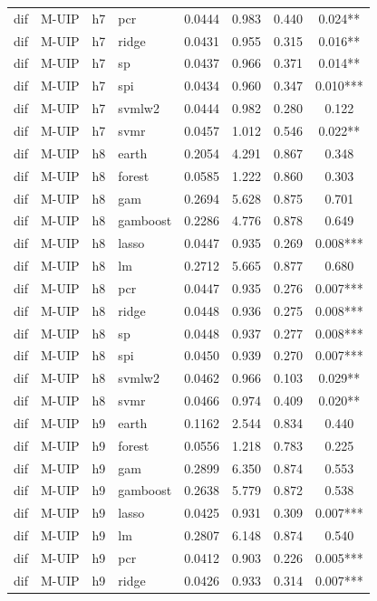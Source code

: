 \begin{ThreePartTable}
\begin{longtable}[t]{llclcccc}
dif & M-UIP & h7 & pcr & 0.0444 & 0.983 & 0.440 & 0.024**\\
dif & M-UIP & h7 & ridge & 0.0431 & 0.955 & 0.315 & 0.016**\\
dif & M-UIP & h7 & sp & 0.0437 & 0.966 & 0.371 & 0.014**\\
dif & M-UIP & h7 & spi & 0.0434 & 0.960 & 0.347 & 0.010***\\
dif & M-UIP & h7 & svmlw2 & 0.0444 & 0.982 & 0.280 & 0.122\\
dif & M-UIP & h7 & svmr & 0.0457 & 1.012 & 0.546 & 0.022**\\
\addlinespace
dif & M-UIP & h8 & earth & 0.2054 & 4.291 & 0.867 & 0.348\\
dif & M-UIP & h8 & forest & 0.0585 & 1.222 & 0.860 & 0.303\\
dif & M-UIP & h8 & gam & 0.2694 & 5.628 & 0.875 & 0.701\\
dif & M-UIP & h8 & gamboost & 0.2286 & 4.776 & 0.878 & 0.649\\
dif & M-UIP & h8 & lasso & 0.0447 & 0.935 & 0.269 & 0.008***\\
dif & M-UIP & h8 & lm & 0.2712 & 5.665 & 0.877 & 0.680\\
dif & M-UIP & h8 & pcr & 0.0447 & 0.935 & 0.276 & 0.007***\\
dif & M-UIP & h8 & ridge & 0.0448 & 0.936 & 0.275 & 0.008***\\
dif & M-UIP & h8 & sp & 0.0448 & 0.937 & 0.277 & 0.008***\\
dif & M-UIP & h8 & spi & 0.0450 & 0.939 & 0.270 & 0.007***\\
dif & M-UIP & h8 & svmlw2 & 0.0462 & 0.966 & 0.103 & 0.029**\\
dif & M-UIP & h8 & svmr & 0.0466 & 0.974 & 0.409 & 0.020**\\
\addlinespace
dif & M-UIP & h9 & earth & 0.1162 & 2.544 & 0.834 & 0.440\\
dif & M-UIP & h9 & forest & 0.0556 & 1.218 & 0.783 & 0.225\\
dif & M-UIP & h9 & gam & 0.2899 & 6.350 & 0.874 & 0.553\\
dif & M-UIP & h9 & gamboost & 0.2638 & 5.779 & 0.872 & 0.538\\
dif & M-UIP & h9 & lasso & 0.0425 & 0.931 & 0.309 & 0.007***\\
dif & M-UIP & h9 & lm & 0.2807 & 6.148 & 0.874 & 0.540\\
dif & M-UIP & h9 & pcr & 0.0412 & 0.903 & 0.226 & 0.005***\\
dif & M-UIP & h9 & ridge & 0.0426 & 0.933 & 0.314 & 0.007***\\

\end{longtable}
\end{ThreePartTable}
